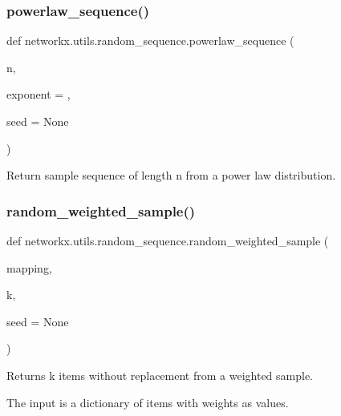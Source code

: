 \subsubsection{\texorpdfstring{powerlaw\+\_\+sequence()}{powerlaw\_sequence()}}
{\footnotesize\ttfamily def networkx.\+utils.\+random\+\_\+sequence.\+powerlaw\+\_\+sequence (\begin{DoxyParamCaption}\item[{}]{n,  }\item[{}]{exponent = {},  }\item[{}]{seed = {\ttfamily None} }\end{DoxyParamCaption})}

\begin{DoxyVerb}Return sample sequence of length n from a power law distribution.
\end{DoxyVerb}
 \mbox{\label{namespacenetworkx_1_1utils_1_1random__sequence_a8f3014b204ae237de04167b9a7afc8c1}} 
\subsubsection{\texorpdfstring{random\+\_\+weighted\+\_\+sample()}{random\_weighted\_sample()}}
{\footnotesize\ttfamily def networkx.\+utils.\+random\+\_\+sequence.\+random\+\_\+weighted\+\_\+sample (\begin{DoxyParamCaption}\item[{}]{mapping,  }\item[{}]{k,  }\item[{}]{seed = {\ttfamily None} }\end{DoxyParamCaption})}

\begin{DoxyVerb}Returns k items without replacement from a weighted sample.

The input is a dictionary of items with weights as values.
\end{DoxyVerb}
 \mbox{\label{namespacenetworkx_1_1utils_1_1random__sequence_ad9f55d9570fb72f739f539f71e32e459}} 
